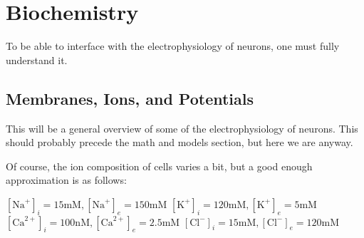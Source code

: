 

\chapter{Biochemistry}

To be able to interface with the electrophysiology of neurons, one must fully understand it. 

\section{Membranes, Ions, and Potentials}

This will be a general overview of some of the electrophysiology of neurons. This should probably precede the math and models section, but here we are anyway.\newline

Of course, the ion composition of cells varies a bit, but a good enough approximation is as follows:\newline 


\hspace*{0.1in} $[\mathrm{Na}^+]_i = 15\mathrm{mM}, [\mathrm{Na}^+]_e = 150\mathrm{mM}$\newline
\hspace*{0.1in} $[\mathrm{K}^+]_i = 120\mathrm{mM}, [\mathrm{K}^+]_e = 5\mathrm{mM}$ \newline
\hspace*{0.1in} $[\mathrm{Ca}^{2+}]_i = 100\mathrm{nM}, 
[\mathrm{Ca}^{2+}]_e = 2.5\mathrm{mM}$\newline
\hspace*{0.1in} $[\mathrm{Cl}^-]_i = 15\mathrm{mM}, [\mathrm{Cl}^-]_e = 120\mathrm{mM}$ 
\newline


